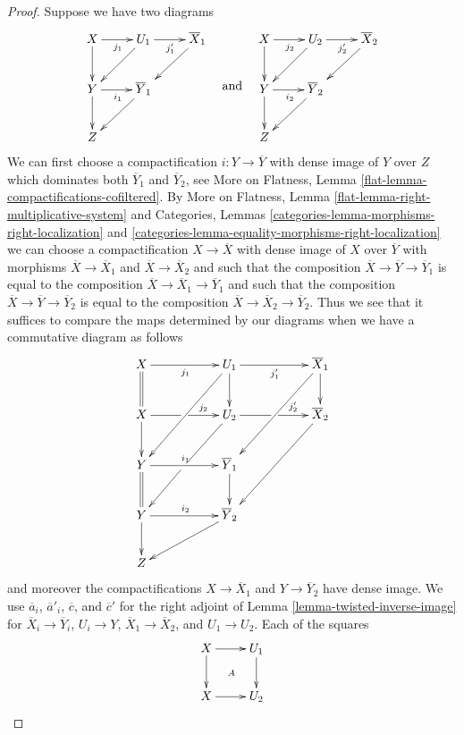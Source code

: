 \begin{proof}
\medskip\noindent
Suppose we have two diagrams
$$
\vcenter{
\xymatrix{
X \ar[r]_{j_1} \ar[d] & U_1 \ar[dl] \ar[r]_{j'_1} & \overline{X}_1 \ar[dl] \\
Y \ar[r]_{i_1} \ar[d] & \overline{Y}_1 \ar[dl] \\
Z
}
}
\quad\text{and}\quad
\vcenter{
\xymatrix{
X \ar[r]_{j_2} \ar[d] & U_2 \ar[dl] \ar[r]_{j'_2} & \overline{X}_2 \ar[dl] \\
Y \ar[r]_{i_2} \ar[d] & \overline{Y}_2 \ar[dl] \\
Z
}
}
$$
We can first choose a compactification $i : Y \to \overline{Y}$
with dense image of $Y$ over $Z$ which dominates both
$\overline{Y}_1$ and $\overline{Y}_2$,
see More on Flatness, Lemma \ref{flat-lemma-compactifications-cofiltered}.
By More on Flatness, Lemma \ref{flat-lemma-right-multiplicative-system} and
Categories, Lemmas \ref{categories-lemma-morphisms-right-localization} and
\ref{categories-lemma-equality-morphisms-right-localization}
we can choose a compactification $X \to \overline{X}$ with dense image of
$X$ over $\overline{Y}$ with morphisms $\overline{X} \to \overline{X}_1$
and $\overline{X} \to \overline{X}_2$ and such that the composition
$\overline{X} \to \overline{Y} \to \overline{Y}_1$ is equal to
the composition $\overline{X} \to \overline{X}_1 \to \overline{Y}_1$
and such that the composition
$\overline{X} \to \overline{Y} \to \overline{Y}_2$ is equal to
the composition $\overline{X} \to \overline{X}_2 \to \overline{Y}_2$.
Thus we see that it suffices to compare the maps
determined by our diagrams when we have a commutative diagram
as follows
$$
\xymatrix{
X \ar[rr]_{j_1} \ar@{=}[d] & &
U_1 \ar[d] \ar[ddll] \ar[rr]_{j'_1} & &
\overline{X}_1 \ar[d] \ar[ddll] \\
X \ar'[r][rr]^-{j_2} \ar[d] & &
U_2 \ar'[dl][ddll] \ar'[r][rr]^-{j'_2} & &
\overline{X}_2 \ar[ddll] \\
Y \ar[rr]^{i_1} \ar@{=}[d] & & \overline{Y}_1 \ar[d] \\
Y \ar[rr]^{i_2} \ar[d] & & \overline{Y}_2 \ar[dll] \\
Z
}
$$
and moreover the compactifications $X \to \overline{X}_1$ and
$Y \to \overline{Y}_2$ have dense image.
We use $\overline{a}_i$, $\overline{a}'_i$, $\overline{c}$, and
$\overline{c}'$ for the
right adjoint of Lemma \ref{lemma-twisted-inverse-image} for
$\overline{X}_i \to \overline{Y}_i$, $U_i \to Y$,
$\overline{X}_1 \to \overline{X}_2$, and $U_1 \to U_2$.
Each of the squares
$$
\xymatrix{
X \ar[r] \ar[d] \ar@{}[dr]|A & U_1 \ar[d] \\
X \ar[r] & U_2
}$$
\end{proof}
